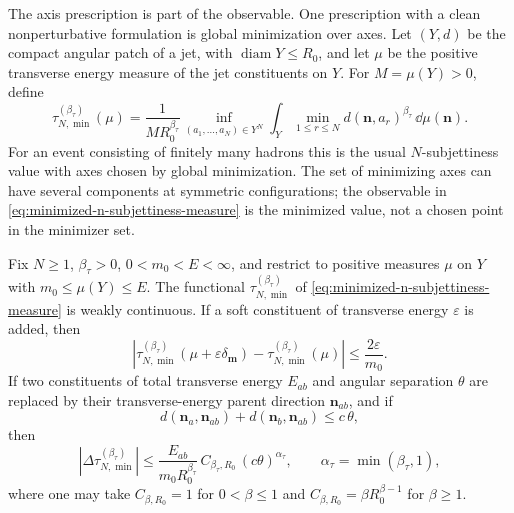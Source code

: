 The axis prescription is part of the observable.  One prescription with a
clean nonperturbative formulation is global minimization over axes.  Let
\((Y,d)\) be the compact angular patch of a jet, with
\(\operatorname{diam}Y\le R_0\), and let \(\mu\) be the positive transverse
energy measure of the jet constituents on \(Y\).  For \(M=\mu(Y)>0\), define
\begin{equation}
  \tau_{N,\min}^{(\beta_\tau)}(\mu)
  =
  \frac1{M R_0^{\beta_\tau}}
  \inf_{(a_1,\ldots,a_N)\in Y^N}
  \int_Y
  \min_{1\le r\le N}d(\mathbf n,a_r)^{\beta_\tau}\,
  \dd\mu(\mathbf n).
  \label{eq:minimized-n-subjettiness-measure}
\end{equation}
For an event consisting of finitely many hadrons this is the usual
\(N\)-subjettiness value with axes chosen by global minimization.  The set of
minimizing axes can have several components at symmetric configurations; the
observable in \eqref{eq:minimized-n-subjettiness-measure} is the minimized
value, not a chosen point in the minimizer set.

\begin{lemma}
\label{lem:minimized-subjettiness-continuity}
Fix \(N\ge1\), \(\beta_\tau>0\), \(0<m_0<E<\infty\), and restrict to positive
measures \(\mu\) on \(Y\) with \(m_0\le \mu(Y)\le E\).  The functional
\(\tau_{N,\min}^{(\beta_\tau)}\) of
\eqref{eq:minimized-n-subjettiness-measure} is weakly continuous.  If a soft
constituent of transverse energy \(\varepsilon\) is added, then
\begin{equation}
  \left|
  \tau_{N,\min}^{(\beta_\tau)}(\mu+\varepsilon\delta_{\mathbf m})
  -
  \tau_{N,\min}^{(\beta_\tau)}(\mu)
  \right|
  \le \frac{2\varepsilon}{m_0}.
  \label{eq:minimized-subjettiness-soft-bound}
\end{equation}
If two constituents of total transverse energy \(E_{ab}\) and angular
separation \(\theta\) are replaced by their transverse-energy parent direction
\(\mathbf n_{ab}\), and if
\[
  d(\mathbf n_a,\mathbf n_{ab})+d(\mathbf n_b,\mathbf n_{ab})
  \le c\,\theta ,
\]
then
\begin{equation}
  \left|
  \Delta\tau_{N,\min}^{(\beta_\tau)}
  \right|
  \le
  \frac{E_{ab}}{m_0R_0^{\beta_\tau}}\,
  C_{\beta_\tau,R_0}\,(c\theta)^{\alpha_\tau},
  \qquad
  \alpha_\tau=\min(\beta_\tau,1),
  \label{eq:minimized-subjettiness-collinear-bound}
\end{equation}
where one may take \(C_{\beta,R_0}=1\) for \(0<\beta\le1\) and
\(C_{\beta,R_0}=\beta R_0^{\beta-1}\) for \(\beta\ge1\).
\end{lemma}

